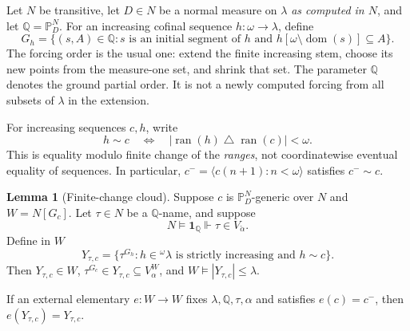 \documentclass[11pt,letterpaper]{article}
\theoremstyle{definition}
\newtheorem{lemma}[definition]{Lemma}
\newcommand{\ran}{\operatorname{ran}}
\newcommand{\dom}{\operatorname{dom}}
\newcommand{\forces}{\Vdash}
\newcommand{\PP}{\mathbb P}
\newcommand{\QQ}{\mathbb Q}
\newcommand{\seq}[1]{\langle #1\rangle}
\begin{document}
Let $N$ be transitive, let $D\in N$ be a normal measure on $\lambda$
\emph{as computed in $N$}, and let $\QQ=\PP_D^N$. For an increasing
cofinal sequence $h:\omega\to\lambda$, define
\[
 G_h=\{(s,A)\in\QQ:s\text{ is an initial segment of }h
                  \text{ and }h[\omega\setminus\dom(s)]\subseteq A\}.
\]
The forcing order is the usual one: extend the finite increasing stem,
choose its new points from the measure-one set, and shrink that set.
The parameter $\QQ$ denotes the ground partial order. It is not a newly
computed forcing from all subsets of $\lambda$ in the extension.

For increasing sequences $c,h$, write
\begin{equation}\label{eq:finitechange}
 h\sim c\quad\Longleftrightarrow\quad
       |\ran(h)\mathbin{\triangle}\ran(c)|<\omega.
\end{equation}
This is equality modulo finite change of the \emph{ranges}, not
coordinatewise eventual equality of sequences. In particular,
$c^-=\seq{c(n+1):n<\omega}$ satisfies $c^-\sim c$.

\Needspace{185pt}
\begin{lemma}[Finite-change cloud]\label{lem:cloud}
Suppose $c$ is $\PP_D^N$-generic over $N$ and $W=N[G_c]$. Let
$\tau\in N$ be a $\QQ$-name, and suppose
\[
 N\models\mathbf 1_{\QQ}\forces\tau\in V_{\check\alpha}.
\]
Define in $W$
\begin{equation}\label{eq:cloud}
 Y_{\tau,c}=
 \{\tau^{G_h}:h\in{}^\omega\lambda\text{ is strictly increasing and }h\sim c\}.
\end{equation}
Then $Y_{\tau,c}\in W$, $\tau^{G_c}\in Y_{\tau,c}\subseteq V_\alpha^W$,
and $W\models |Y_{\tau,c}|\leq\lambda$.

If an external elementary $e:W\to W$ fixes $\lambda,\QQ,\tau,\alpha$
and satisfies $e(c)=c^-$, then $e(Y_{\tau,c})=Y_{\tau,c}$.
\end{lemma}
\end{document}
